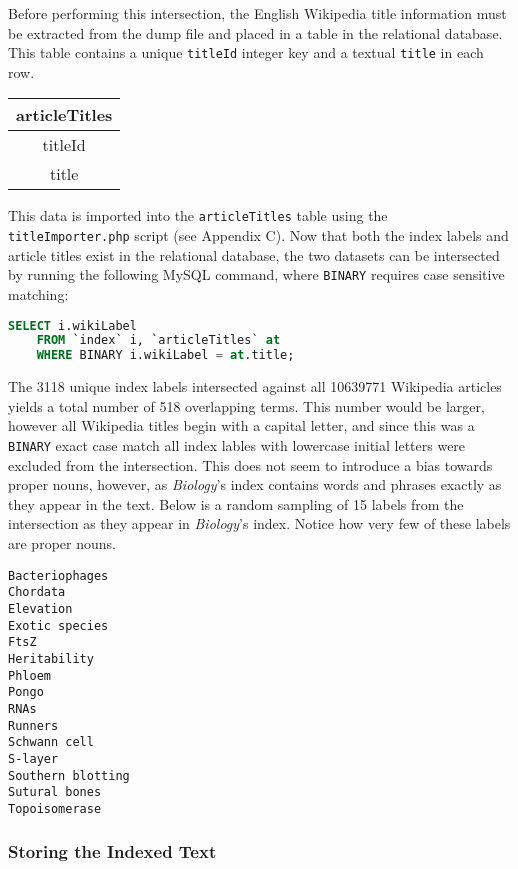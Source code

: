 Before performing this intersection, the English Wikipedia title information must be extracted from the dump file and placed in a table in the relational database.
This table contains a unique {\tt titleId} integer key and a textual {\tt title} in each row.

\begin{center}
\begin{tabular}{|c|}
\hline 
{\bf articleTitles} \\ 
\hline 
titleId \\ 
\hline 
title \\ 
\hline 
\end{tabular} 
\end{center}

This data is imported into the {\tt articleTitles} table using the {\tt titleImporter.php} script (see Appendix C).
Now that both the index labels and article titles exist in the relational database, the two datasets can be intersected by running the following MySQL command, where {\tt BINARY} requires case sensitive matching:

\begin{lstlisting}[language=SQL]
SELECT i.wikiLabel
    FROM `index` i, `articleTitles` at
    WHERE BINARY i.wikiLabel = at.title;
\end{lstlisting}

The 3118 unique index labels intersected against all 10639771 Wikipedia articles yields a total number of 518 overlapping terms.
This number would be larger, however all Wikipedia titles begin with a capital letter, and since this was a {\tt BINARY} exact case match all index lables with lowercase initial letters were excluded from the intersection.
This does not seem to introduce a bias towards proper nouns, however, as {\it Biology}'s index contains words and phrases exactly as they appear in the text.
Below is a random sampling of 15 labels from the intersection as they appear in {\it Biology}'s index.
Notice how very few of these labels are proper nouns.

\begin{multicols}{3}
\begin{verbatim}
Bacteriophages
Chordata
Elevation
Exotic species
FtsZ
Heritability
Phloem
Pongo
RNAs
Runners
Schwann cell
S-layer
Southern blotting
Sutural bones
Topoisomerase
\end{verbatim}
\end{multicols}

\subsubsection{Storing the Indexed Text}


